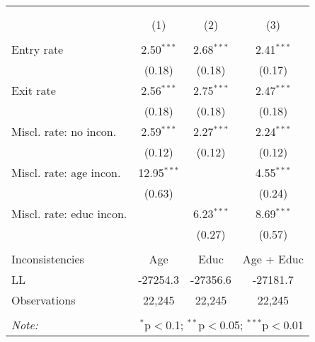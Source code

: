 
\begin{table}[!htbp] \centering 
  \caption{} 
  \label{table_symptoms_implied} 
\begin{tabular}{@{\extracolsep{5pt}}lccc} 
\\[-1.8ex]\hline 
\hline \\[-1.8ex] 
\\[-1.8ex] & (1) & (2) & (3)\\ 
\hline \\[-1.8ex] 
 Entry rate & 2.50$^{***}$ & 2.68$^{***}$ & 2.41$^{***}$ \\ 
  & (0.18) & (0.18) & (0.17) \\ 
  Exit rate & 2.56$^{***}$ & 2.75$^{***}$ & 2.47$^{***}$ \\ 
  & (0.18) & (0.18) & (0.18) \\ 
  Miscl. rate: no incon. & 2.59$^{***}$ & 2.27$^{***}$ & 2.24$^{***}$ \\ 
  & (0.12) & (0.12) & (0.12) \\ 
  Miscl. rate: age incon. & 12.95$^{***}$ &  & 4.55$^{***}$ \\ 
  & (0.63) &  & (0.24) \\ 
  Miscl. rate: educ incon. &  & 6.23$^{***}$ & 8.69$^{***}$ \\ 
  &  & (0.27) & (0.57) \\ 
 \hline \\[-1.8ex] 
Inconsistencies & Age & Educ & Age + Educ \\ 
LL & -27254.3 & -27356.6 & -27181.7 \\ 
Observations & 22,245 & 22,245 & 22,245 \\ 
\hline 
\hline \\[-1.8ex] 
\textit{Note:}  & \multicolumn{3}{r}{$^{*}$p$<$0.1; $^{**}$p$<$0.05; $^{***}$p$<$0.01} \\ 
\end{tabular} 
\end{table} 
